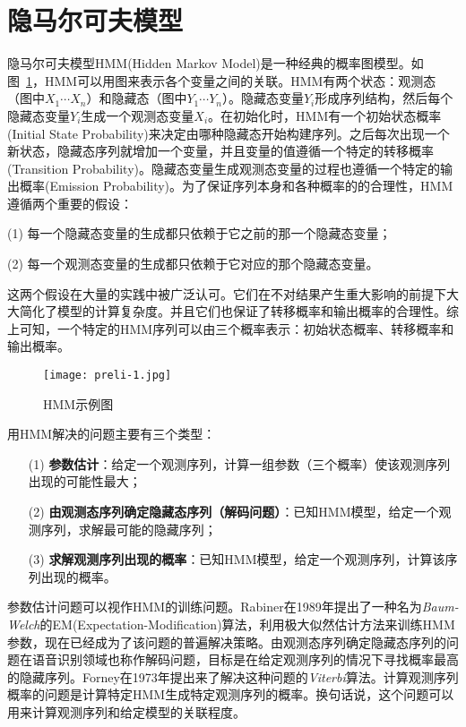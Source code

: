 \section{隐马尔可夫模型}

隐马尔可夫模型HMM(Hidden Markov Model)是一种经典的概率图模型。如图~\ref{fig:hmm}，HMM可以用图来表示各个变量之间的关联。HMM有两个状态：观测态（图中$X_1 \cdots X_n$）和隐藏态（图中$Y_1 \cdots Y_n$）。隐藏态变量$Y_i$形成序列结构，然后每个隐藏态变量$Y_i$生成一个观测态变量$X_i$。在初始化时，HMM有一个初始状态概率(Initial State Probability)来决定由哪种隐藏态开始构建序列。之后每次出现一个新状态，隐藏态序列就增加一个变量，并且变量的值遵循一个特定的转移概率(Transition Probability)。隐藏态变量生成观测态变量的过程也遵循一个特定的输出概率(Emission Probability)。为了保证序列本身和各种概率的的合理性，HMM遵循两个重要的假设：
\begin{enumerate*}		
	\item[(1)] 每一个隐藏态变量的生成都只依赖于它之前的那一个隐藏态变量；
	\item[(2)] 每一个观测态变量的生成都只依赖于它对应的那个隐藏态变量。
\end{enumerate*}
这两个假设在大量的实践中被广泛认可。它们在不对结果产生重大影响的前提下大大简化了模型的计算复杂度。并且它们也保证了转移概率和输出概率的合理性。综上可知，一个特定的HMM序列可以由三个概率表示：初始状态概率、转移概率和输出概率。

\begin{figure}[htbp]
	\centering
	\begin{minipage}[htbp]{0.6\textwidth}
		\centering
		\texttt{[image: preli-1.jpg]}
		\caption[HMM示例图]
		{HMM示例图\label{fig:hmm}}		
	\end{minipage}     
\end{figure}

用HMM解决的问题主要有三个类型：

\begin{enumerate}		
	\item[(1)] \textbf{参数估计}：给定一个观测序列，计算一组参数（三个概率）使该观测序列出现的可能性最大；
	\item[(2)] \textbf{由观测态序列确定隐藏态序列（解码问题）}：已知HMM模型，给定一个观测序列，求解最可能的隐藏序列；
	\item[(3)] \textbf{求解观测序列出现的概率}：已知HMM模型，给定一个观测序列，计算该序列出现的概率。
\end{enumerate}

参数估计问题可以视作HMM的训练问题。Rabiner在1989年提出了一种名为\emph{Baum-Welch}\cite{Rabiner:1989}的EM(Expectation-Modification)算法，利用极大似然估计方法来训练HMM参数，现在已经成为了该问题的普遍解决策略。由观测态序列确定隐藏态序列的问题在语音识别领域也称作解码问题，目标是在给定观测序列的情况下寻找概率最高的隐藏序列。Forney在1973年提出来了解决这种问题的\emph{Viterbi}\cite{Forney:1973}算法。计算观测序列概率的问题是计算特定HMM生成特定观测序列的概率。换句话说，这个问题可以用来计算观测序列和给定模型的关联程度。


